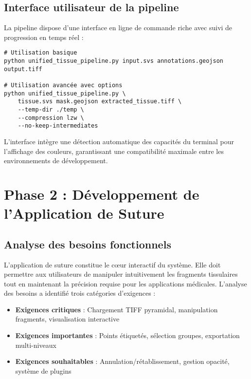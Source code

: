 \documentclass[12pt,a4paper]{report}
\begin{document}
\subsection{Interface utilisateur de la pipeline}

La pipeline dispose d'une interface en ligne de commande riche avec suivi de progression en temps réel :

\begin{lstlisting}[caption=Interface utilisateur de la pipeline]
# Utilisation basique
python unified_tissue_pipeline.py input.svs annotations.geojson output.tiff

# Utilisation avancée avec options
python unified_tissue_pipeline.py \
    tissue.svs mask.geojson extracted_tissue.tiff \
    --temp-dir ./temp \
    --compression lzw \
    --no-keep-intermediates
\end{lstlisting}

L'interface intègre une détection automatique des capacités du terminal pour l'affichage des couleurs, garantissant une compatibilité maximale entre les environnements de développement.

\section{Phase 2 : Développement de l'Application de Suture}

\subsection{Analyse des besoins fonctionnels}

L'application de suture constitue le cœur interactif du système. Elle doit permettre aux utilisateurs de manipuler intuitivement les fragments tissulaires tout en maintenant la précision requise pour les applications médicales. L'analyse des besoins a identifié trois catégories d'exigences :

\begin{itemize}
    \item \textbf{Exigences critiques} : Chargement TIFF pyramidal, manipulation fragments, visualisation interactive
    \item \textbf{Exigences importantes} : Points étiquetés, sélection groupes, exportation multi-niveaux
    \item \textbf{Exigences souhaitables} : Annulation/rétablissement, gestion opacité, système de plugins
\end{itemize}
\end{document}
